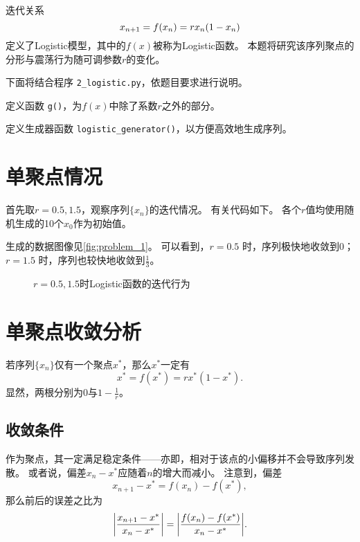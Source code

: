 \lstset{
    language=Python,
    rangeprefix=\#\ ,
    rangesuffix=\ \#,
}
迭代关系
\begin{equation}
    x_{n+1} = f(x_n) = rx_n\qty(1-x_n)
\end{equation}
定义了Logistic模型，其中的$f(x)$被称为Logistic函数。
本题将研究该序列聚点的分形与震荡行为随可调参数$r$的变化。

下面将结合程序 \verb|2_logistic.py|，依题目要求进行说明。

定义函数 \verb|g()|，为$f(x)$中除了系数$r$之外的部分。
{
    \linespread{1.0}
    
}
定义生成器函数 \verb|logistic_generator()|，以方便高效地生成序列。
{
    \linespread{1.0}
    
}

\section{单聚点情况}\label{sec:single}
首先取$r=0.5, 1.5$，观察序列$\{x_n\}$的迭代情况。
有关代码如下。
各个$r$值均使用随机生成的10个$x_0$作为初始值。
{
    \linespread{1.0}
    
}

生成的数据图像见\autoref{fig:problem_1}。
可以看到，\hyperref[fig:problem_1_0.5]{$r=0.5$} 时，序列极快地收敛到0；
\hyperref[fig:problem_1_1.5]{$r=1.5$} 时，序列也较快地收敛到$\frac{1}{3}$。

\begin{figure}
    \centering
    \caption{$r=0.5, 1.5$时Logistic函数的迭代行为}
    \label{fig:problem_1}
\end{figure}

\section{单聚点收敛分析}
若序列$\{x_n\}$仅有一个聚点$x^*$，那么$x^*$一定有
\begin{equation}
    x^* = f(x^*) = rx^*(1-x^*).
\end{equation}
显然，两根分别为$0$与$1-\frac{1}{r}$。

\subsection{收敛条件}
作为聚点，其一定满足稳定条件——亦即，相对于该点的小偏移并不会导致序列发散。
或者说，偏差$x_n-x^*$应随着$n$的增大而减小。
注意到，偏差
\begin{equation}
    x_{n+1} - x^* = f(x_n) - f(x^*),
\end{equation}
那么前后的误差之比为
\begin{equation}\label{eq:error}
    \qty|\frac{x_{n+1} - x^*}{x_{n} - x^*}|
    = \qty|\frac{f(x_n) - f(x^*)}{x_{n} - x^*}|.
\end{equation}

